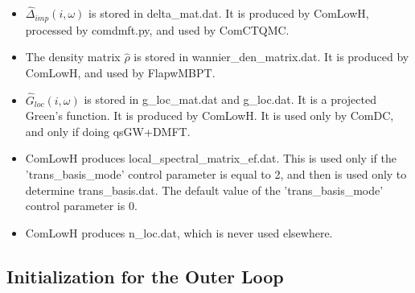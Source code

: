 \documentclass[aps,prb,singlecolumn,preprintnumbers,amsmath,amssymb]{revtex4}
\begin{document}
\begin{itemize}
\item $\hat{\Delta}_{imp}(i,\omega)$ is stored in delta\_mat.dat. It is produced by ComLowH, processed by comdmft.py, and used by ComCTQMC.
\item The density matrix $\hat{\rho}$ is stored in  wannier\_den\_matrix.dat.  It is produced by ComLowH, and used by FlapwMBPT.
\item $\hat{G}_{loc}(i,\omega)$ is stored in  g\_loc\_mat.dat and g\_loc.dat. It is a projected Green's function.  It is produced by ComLowH.  It is used only by ComDC, and only if doing qsGW+DMFT.
\item ComLowH produces local\_spectral\_matrix\_ef.dat.  This is used only if the 'trans\_basis\_mode' control parameter is equal to 2, and then is used only to determine trans\_basis.dat.  The default value of the 'trans\_basis\_mode' control parameter is 0.
\item ComLowH produces n\_loc.dat, which is never used elsewhere.
\end{itemize}

        
\subsection{Initialization for the Outer Loop}
\end{document}
